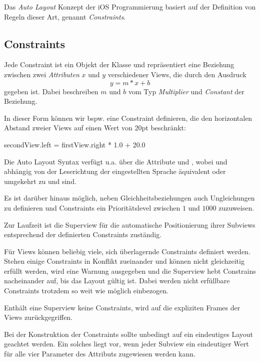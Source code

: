 \documentclass[parskip=half, final]{scrreprt}
\begin{document}
Das \emph{Auto Layout} Konzept der iOS Programmierung basiert auf der Definition von Regeln dieser Art, genannt \emph{Constraints}.

\subsection{Constraints}

Jede Constraint ist ein Objekt der Klasse  und repräsentiert eine Beziehung zwischen zwei \emph{Attributen} $x$ und $y$ verschiedener Views, die durch den Ausdruck
\begin{equation}
y = m*x + b
\end{equation}
gegeben ist. Dabei beschreiben $m$ und $b$ vom Typ  \emph{Multiplier} und \emph{Constant} der Beziehung.

In dieser Form können wir bspw. eine Constraint definieren, die den horizontalen Abstand zweier Views auf einen Wert von 20pt beschränkt:
\begin{swiftcode}
secondView.left = firstView.right * 1.0 + 20.0
\end{swiftcode}

Die Auto Layout Syntax verfügt u.a. über die Attribute  und , wobei  und  abhängig von der Leserichtung der eingestellten Sprache äquivalent oder umgekehrt zu  und  sind.

Es ist darüber hinaus möglich, neben Gleichheitsbeziehungen auch Ungleichungen zu definieren und Constraints ein Prioritätslevel zwischen $1$ und $1000$ zuzuweisen.

Zur Laufzeit ist die Superview für die automatische Positionierung ihrer Subviews entsprechend der definierten Constraints zuständig.

Für Views können beliebig viele, sich überlagernde Constraints definiert werden. Stehen einige Constraints in Konflikt zueinander und können nicht gleichzeitig erfüllt werden, wird eine Warnung ausgegeben und die Superview hebt Constrains nacheinander auf, bis das Layout gültig ist. Dabei werden nicht erfüllbare Constraints trotzdem so weit wie möglich einbezogen.

Enthält eine Superview keine Constraints, wird auf die expliziten Frames der Views zurückgegriffen.

Bei der Konstruktion der Constraints sollte unbedingt auf ein eindeutiges Layout geachtet werden. Ein solches liegt vor, wenn jeder Subview ein eindeutiger Wert für alle vier Parameter des  Attributs zugewiesen werden kann.
\end{document}
